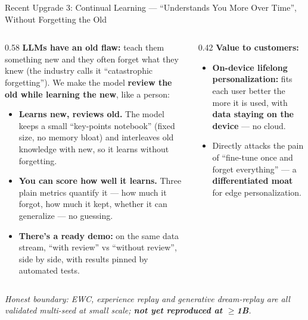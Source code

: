﻿\documentclass[aspectratio=169, 10pt]{beamer}
\begin{document}
\begin{frame}{Recent Upgrade 3: Continual Learning --- ``Understands You More Over Time'', Without Forgetting the Old}
\small
\begin{columns}
\begin{column}{0.58\textwidth}
\textbf{LLMs have an old flaw:} teach them something new and they often forget what they knew (the industry calls it ``catastrophic forgetting''). We make the model \textbf{review the old while learning the new}, like a person:
\begin{itemize}\itemsep=0.3em
    \item \textbf{Learns new, reviews old.} The model keeps a small ``key-points notebook'' (fixed size, no memory bloat) and interleaves old knowledge with new, so it learns without forgetting.
    \item \textbf{You can score how well it learns.} Three plain metrics quantify it --- how much it forgot, how much it kept, whether it can generalize --- no guessing.
    \item \textbf{There's a ready demo:} on the same data stream, ``with review'' vs ``without review'', side by side, with results pinned by automated tests.
\end{itemize}
\end{column}
\begin{column}{0.42\textwidth}
\textbf{Value to customers:}
\begin{itemize}\itemsep=0.3em
    \item \textbf{On-device lifelong personalization:} fits each user better the more it is used, with \textbf{data staying on the device} --- no cloud.
    \item Directly attacks the pain of ``fine-tune once and forget everything'' --- a \textbf{differentiated moat} for edge personalization.
\end{itemize}
\end{column}
\end{columns}
\vspace{0.3em}
{\footnotesize\itshape Honest boundary: EWC, experience replay and generative dream-replay are all validated multi-seed at small scale; \textbf{not yet reproduced at $\geq$1B}.}
\end{frame}
\end{document}
